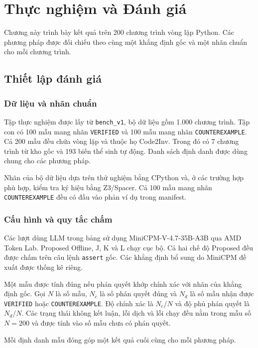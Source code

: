 \chapter{Thực nghiệm và Đánh giá}
\label{ch:evaluation}

Chương này trình bày kết quả trên 200 chương trình vòng lặp Python. Các phương pháp được đối chiếu theo cùng một khẳng định gốc và một nhãn chuẩn cho mỗi chương trình.

\section{Thiết lập đánh giá}
\label{sec:eval_setup}

\subsection{Dữ liệu và nhãn chuẩn}
\label{sec:datasets}

Tập thực nghiệm được lấy từ \texttt{bench\_v1}, bộ dữ liệu gồm 1.000 chương trình. Tập con có 100 mẫu mang nhãn \texttt{VERIFIED} và 100 mẫu mang nhãn \texttt{COUNTEREXAMPLE}. Cả 200 mẫu đều chứa vòng lặp và thuộc họ Code2Inv. Trong đó có 7 chương trình từ kho gốc và 193 biến thể sinh tự động. Danh sách định danh được dùng chung cho các phương pháp.

Nhãn của bộ dữ liệu dựa trên thử nghiệm bằng CPython và, ở các trường hợp phù hợp, kiểm tra ký hiệu bằng Z3/Spacer. Cả 100 mẫu mang nhãn \texttt{COUNTEREXAMPLE} đều có đầu vào phản ví dụ trong manifest.

\subsection{Cấu hình và quy tắc chấm}

Các lượt dùng LLM trong bảng sử dụng MiniCPM-V-4.7-35B-A3B qua AMD Token Lab. Proposed Offline, J, K và L chạy cục bộ. Cả hai chế độ Proposed đều được chấm trên câu lệnh \texttt{assert} gốc. Các khẳng định bổ sung do MiniCPM đề xuất được thống kê riêng.

Một mẫu được tính đúng nếu phán quyết khớp chính xác với nhãn của khẳng định gốc. Gọi $N$ là số mẫu, $N_c$ là số phán quyết đúng và $N_d$ là số mẫu nhận được \texttt{VERIFIED} hoặc \texttt{COUNTEREXAMPLE}. Độ chính xác là $N_c/N$ và độ phủ phán quyết là $N_d/N$. Các trạng thái không kết luận, lỗi dịch và lỗi chạy đều nằm trong mẫu số $N=200$ và được tính vào số mẫu chưa có phán quyết.

Mỗi định danh mẫu đóng góp một kết quả cuối cùng cho mỗi phương pháp.

